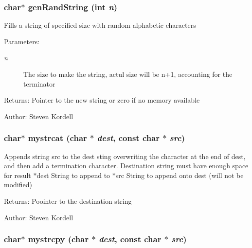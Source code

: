 \subsubsection{\setlength{\rightskip}{0pt plus 5cm}char$\ast$ gen\-Rand\-String (int {\em n})}\label{mystring_8c_6d35dbb5801b4a0118ee8fca9413285a}


Fills a string of specified size with random alphabetic characters \begin{Desc}
\item[Parameters:]
\begin{description}
\item[{\em n}]The size to make the string, actul size will be n+1, accounting for the terminator \end{description}
\end{Desc}
\begin{Desc}
\item[Returns:]Pointer to the new string or zero if no memory available \end{Desc}
\begin{Desc}
\item[Author:]Steven Kordell \end{Desc}
\subsubsection{\setlength{\rightskip}{0pt plus 5cm}char$\ast$ mystrcat (char $\ast$ {\em dest}, const char $\ast$ {\em src})}\label{mystring_8c_2cb0b44ce485a993e756027da5de81f5}


Appends string src to the dest sting overwriting the  character at the end of dest, and then add a termination  character. Destination string must have enough space for result  $\ast$dest String to append to  $\ast$src String to append onto dest (will not be modified) \begin{Desc}
\item[Returns:]Poointer to the destination string \end{Desc}
\begin{Desc}
\item[Author:]Steven Kordell \end{Desc}
\subsubsection{\setlength{\rightskip}{0pt plus 5cm}char$\ast$ mystrcpy (char $\ast$ {\em dest}, const char $\ast$ {\em src})}\label{mystring_8c_904b16ff21c3142202e139a3ac79e19a}


